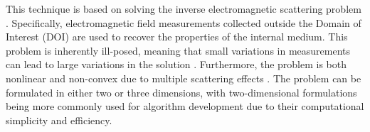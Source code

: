 \documentclass{IEEEtran}
\begin{document}

        This technique is based on solving the inverse electromagnetic scattering problem \cite{chen2018computational}. Specifically, electromagnetic field measurements collected outside the Domain of Interest (DOI) are used to recover the properties of the internal medium. This problem is inherently ill-posed, meaning that small variations in measurements can lead to large variations in the solution \cite{colton2019inverse}. Furthermore, the problem is both nonlinear and non-convex due to multiple scattering effects \cite{chen2018computational}. The problem can be formulated in either two or three dimensions, with two-dimensional formulations being more commonly used for algorithm development due to their computational simplicity and efficiency.
        
\end{document}
